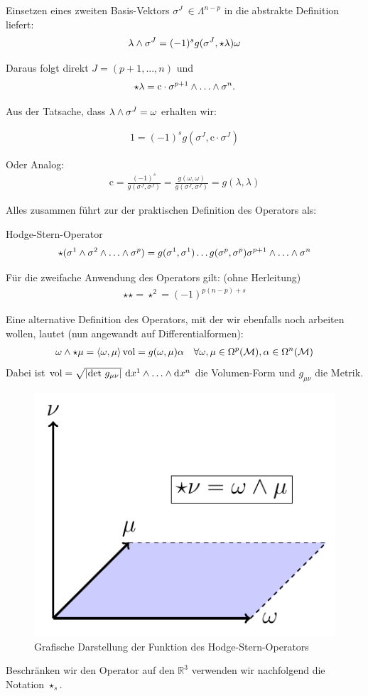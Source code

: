  Einsetzen eines zweiten Basis-Vektors $\sigma^J \ \in \Lambda^{n-p}$ in die abstrakte Definition liefert:
\begin{align}
\lambda \wedge \sigma^J = (-1)^s g(\sigma^J,\star \lambda)\omega
\end{align}

Daraus folgt direkt $J = (p+1, ..., n)$ und 
\begin{align}
\star\lambda = \text{c} \cdot \sigma^{p+1} \w \dots \w \sigma^n.
\end{align}

Aus der Tatsache, dass $\lambda \wedge \sigma^J = \omega$ erhalten wir:

\begin{align}
1 = (-1)^s g(\sigma^J,\text{c}\cdot\sigma^J)
\end{align}

Oder Analog:
\begin{align}
\text{c}= \frac{(-1)^s}{g(\sigma^J,\sigma^J)} = \frac{g(\omega,\omega)}{g(\sigma^J,\sigma^J)} = g(\lambda,\lambda)
\end{align}

Alles zusammen führt zur der praktischen Definition des Operators als:
\begin{mybox}{Hodge-Stern-Operator}
\begin{align}
\star(\sigma^1 \w \sigma^2 \w \dots \w \sigma^p) = g(\sigma^1,\sigma^1)\dots g(\sigma^p,\sigma^p) \sigma^{p+1}\w \dots \w \sigma^n
\end{align}
\end{mybox}


 Für die zweifache Anwendung des Operators gilt: (ohne Herleitung)
 \begin{align}
 \star \star = \star^2 = (-1)^{p(n-p)+s}
 \end{align}






Eine alternative Definition des Operators, mit der wir ebenfalls noch arbeiten wollen, lautet (nun angewandt auf Differentialformen):
\begin{align}
\omega \wedge \star \mu = \left<\omega,\mu \right>\text{vol} = g(\omega,\mu)\alpha \quad \forall \omega, \mu \in \Omega^p(\mathcal{M}), \alpha \in \Omega^n(\mathcal{M})
\end{align}
Dabei ist $\text{vol} = \sqrt{\abs{\text{det} \ g_{\mu\nu}}} \ \dd x^1 \w \dots \w \dd x^n$ die Volumen-Form und $g_{\mu\nu}$ die Metrik. \\
\begin{figure}[H]
	\centering
	\includegraphics[width=.3\linewidth]{figures/darstellung-hodge.pdf}
	\caption{Grafische Darstellung der Funktion des Hodge-Stern-Operators}
\end{figure}
Beschränken wir den Operator auf den $\mathbb{R}^3$ verwenden wir nachfolgend die Notation $\star_s$.

